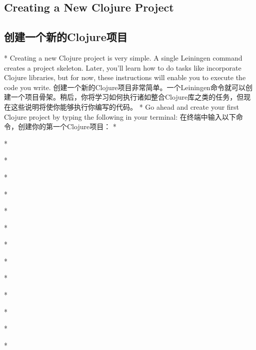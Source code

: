 \begin{paracol}{2}
\subsection{Creating a New Clojure Project}
\switchcolumn
\subsection{创建一个新的Clojure项目}
\switchcolumn[0]*
Creating a new Clojure project is very simple. A single Leiningen
command creates a project skeleton. Later, you'll learn how to do tasks
like incorporate Clojure libraries, but for now, these instructions will
enable you to execute the code you write.
\switchcolumn
创建一个新的Clojure项目非常简单。一个Leiningen命令就可以创建一个项目骨架。稍后，你将学习如何执行诸如整合Clojure库之类的任务，但现在这些说明将使你能够执行你编写的代码。
\switchcolumn[0]*
Go ahead and create your first Clojure project by typing the following
in your terminal:
\switchcolumn
在终端中输入以下命令，创建你的第一个Clojure项目：
\switchcolumn[0]*

\switchcolumn

\switchcolumn[0]*

\switchcolumn

\switchcolumn[0]*

\switchcolumn

\switchcolumn[0]*

\switchcolumn

\switchcolumn[0]*

\switchcolumn

\switchcolumn[0]*

\switchcolumn

\switchcolumn[0]*

\switchcolumn


\switchcolumn[0]*

\switchcolumn


\switchcolumn[0]*

\switchcolumn

\switchcolumn[0]*

\switchcolumn


\switchcolumn[0]*

\switchcolumn

\switchcolumn[0]*

\switchcolumn


\switchcolumn[0]*

\switchcolumn

\switchcolumn[0]*

\switchcolumn



\end{paracol}
